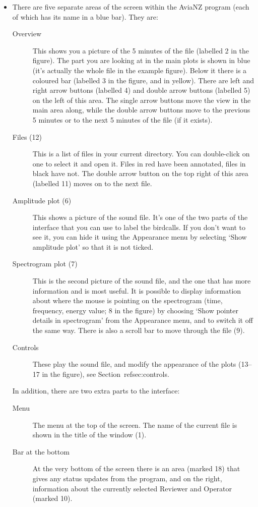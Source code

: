 \documentclass{article}
\begin{document}
\newpage
\begin{itemize}
\item There are five separate areas of the screen within the AviaNZ program (each of which has its name in a blue bar). They are:
	\begin{description}
	\item[Overview] This shows you a picture of the 5 minutes of the file (labelled 2 in the figure). The part you are looking at in the main plots is shown in blue (it's actually the whole file in the example figure). Below it there is a coloured bar (labelled 3 in the figure, and in yellow). There are left and right arrow buttons (labelled 4) and double arrow buttons (labelled 5) on the left of this area. The single arrow buttons move the view in the main area along, while the double arrow buttons move to the previous 5 minutes or to the next 5 minutes of the file (if it exists). 
	\item [Files (12)] This is a list of files in your current directory. You can double-click on one to select it and open it. Files in red have been annotated, files in black have not. The double arrow button on the top right of this area (labelled 11) moves on to the next file.
	\item[Amplitude plot (6)] This shows a picture of the sound file. It's one of the two parts of the interface that you can use to label the birdcalls. If you don't want to see it, you can hide it using the Appearance menu by selecting `Show amplitude plot' so that it is not ticked.
	\item[Spectrogram plot (7)] This is the second picture of the sound file, and the one that has more information and is most useful. It is possible to display information about where the mouse is pointing on the spectrogram (time, frequency, energy value; 8 in the figure) by choosing `Show pointer details in spectrogram' from the Appearance menu, and to switch it off the same way. There is also a scroll bar to move through the file (9). 
	\item[Controls] These play the sound file, and modify the appearance of the plots (13--17 in the figure), see Section~ref{sec:controls}.
	\end{description}

In addition, there are two extra parts to the interface:
	\begin{description}
	\item[Menu] The menu at the top of the screen. The name of the current file is shown in the title of the window (1).
	\item[Bar at the bottom] At the very bottom of the screen there is an area (marked 18) that gives any status updates from the program, and on the right, information about the currently selected Reviewer and Operator (marked 10).
	\end{description}


\end{itemize}
\end{document}

